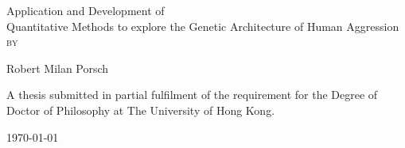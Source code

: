 \documentclass[header.tex]{subfiles}
\newlength{\drop}
\begin{document}
\begin{titlepage}
  \textheight
  \centering
  \vspace*{\baselineskip}
  {\LARGE Application and Development of \\ Quantitative Methods to explore the Genetic Architecture of Human Aggression}\\[0.2\baselineskip]
  \scshape
  \vspace*{2\baselineskip}
  by \\[\baselineskip]
  {\Large Robert Milan Porsch\par}
  \vfill
  A thesis submitted in partial fulfilment of the requirement for the Degree of Doctor of Philosophy at The University of Hong Kong.\par
  {\today\par}
\end{titlepage}
\end{document}
